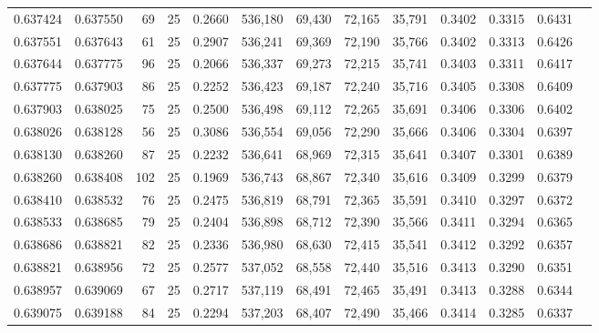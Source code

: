 \begin{tabular}{rrrrrrrrrrrrr}
0.637424 & 0.637550 &    69 &  25 &                                     0.2660 & 536,180 &  69,430 &  72,165 &  35,791 & 0.3402 & 0.3315 & 0.6431 \\
0.637551 & 0.637643 &    61 &  25 &                                     0.2907 & 536,241 &  69,369 &  72,190 &  35,766 & 0.3402 & 0.3313 & 0.6426 \\
0.637644 & 0.637775 &    96 &  25 &                                     0.2066 & 536,337 &  69,273 &  72,215 &  35,741 & 0.3403 & 0.3311 & 0.6417 \\
0.637775 & 0.637903 &    86 &  25 &                                     0.2252 & 536,423 &  69,187 &  72,240 &  35,716 & 0.3405 & 0.3308 & 0.6409 \\
0.637903 & 0.638025 &    75 &  25 &                                     0.2500 & 536,498 &  69,112 &  72,265 &  35,691 & 0.3406 & 0.3306 & 0.6402 \\
0.638026 & 0.638128 &    56 &  25 &                                     0.3086 & 536,554 &  69,056 &  72,290 &  35,666 & 0.3406 & 0.3304 & 0.6397 \\
0.638130 & 0.638260 &    87 &  25 &                                     0.2232 & 536,641 &  68,969 &  72,315 &  35,641 & 0.3407 & 0.3301 & 0.6389 \\
0.638260 & 0.638408 &   102 &  25 &                                     0.1969 & 536,743 &  68,867 &  72,340 &  35,616 & 0.3409 & 0.3299 & 0.6379 \\
0.638410 & 0.638532 &    76 &  25 &                                     0.2475 & 536,819 &  68,791 &  72,365 &  35,591 & 0.3410 & 0.3297 & 0.6372 \\
0.638533 & 0.638685 &    79 &  25 &                                     0.2404 & 536,898 &  68,712 &  72,390 &  35,566 & 0.3411 & 0.3294 & 0.6365 \\
0.638686 & 0.638821 &    82 &  25 &                                     0.2336 & 536,980 &  68,630 &  72,415 &  35,541 & 0.3412 & 0.3292 & 0.6357 \\
0.638821 & 0.638956 &    72 &  25 &                                     0.2577 & 537,052 &  68,558 &  72,440 &  35,516 & 0.3413 & 0.3290 & 0.6351 \\
0.638957 & 0.639069 &    67 &  25 &                                     0.2717 & 537,119 &  68,491 &  72,465 &  35,491 & 0.3413 & 0.3288 & 0.6344 \\
0.639075 & 0.639188 &    84 &  25 &                                     0.2294 & 537,203 &  68,407 &  72,490 &  35,466 & 0.3414 & 0.3285 & 0.6337 \\

\end{tabular}
